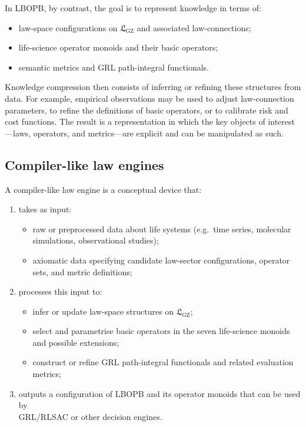 \documentclass[11pt]{book}
\theoremstyle{plain}
\theoremstyle{definition}
\theoremstyle{remark}
\newcommand{\GZLS}{\ensuremath{\mathfrak{L}_{\mathrm{GZ}}}}       \newcommand{\GZLT}{\ensuremath{M_{!w}}}                           \newcommand{\GZLOC}{\ensuremath{A_M}}                             \newcommand{\GZLCurv}{\ensuremath{\mathcal{F}_{\mathrm{law}}}}
\begin{document}
In LBOPB, by contrast, the goal is to represent knowledge in terms of:

\begin{itemize}
  \item law-space configurations on $\GZLS$ and associated
        law-connections;
  \item life-science operator monoids and their basic operators;
  \item semantic metrics and GRL path-integral functionals.
\end{itemize}

Knowledge compression then consists of inferring or refining these
structures from data. For example, empirical observations may be used
to adjust law-connection parameters, to refine the definitions of
basic operators, or to calibrate risk and cost functions. The result is
a representation in which the key objects of interest—laws, operators,
and metrics—are explicit and can be manipulated as such.

\subsection*{Compiler-like law engines}

A compiler-like law engine is a conceptual device that:

\begin{enumerate}
  \item takes as input:
        \begin{itemize}
          \item raw or preprocessed data about life systems (e.g.\
                time series, molecular simulations, observational
                studies);
          \item axiomatic data specifying candidate law-sector
                configurations, operator sets, and metric definitions;
        \end{itemize}
  \item processes this input to:
        \begin{itemize}
          \item infer or update law-space structures on $\GZLS$;
          \item select and parametrise basic operators in the seven
                life-science monoids and possible extensions;
          \item construct or refine GRL path-integral functionals and
                related evaluation metrics;
        \end{itemize}
  \item outputs a configuration of LBOPB and its operator monoids that
        can be used by \\GRL/RLSAC or other decision engines.
\end{enumerate}
\end{document}

